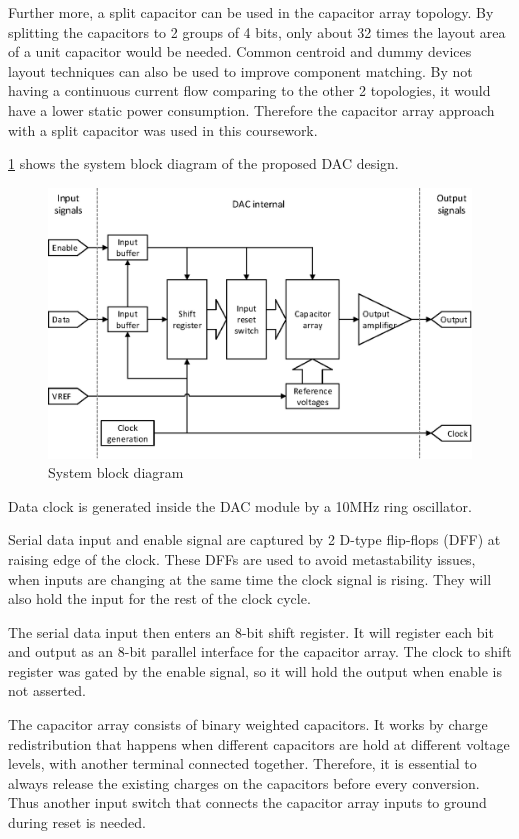 \documentclass[journal]{IEEEtran}
\newcommand{\fref}[1]{\figurename \ref{#1}}
\begin{document}
Further more, a split capacitor can be used in the capacitor array topology. By splitting the capacitors to 2 groups of 4 bits, only about 32 times the layout area of a unit capacitor would be needed. Common centroid and dummy devices layout techniques can also be used to improve component matching. By not having a continuous current flow comparing to the other 2 topologies, it would have a lower static power consumption. Therefore the capacitor array approach with a split capacitor was used in this coursework.

\fref{fig_system} shows the system block diagram of the proposed DAC design.

\begin{figure}[!t]
	\centering
	\includegraphics[width=\columnwidth]{System}
	\caption{System block diagram}
	\label{fig_system}
\end{figure}

Data clock is generated inside the DAC module by a 10MHz ring oscillator.

Serial data input and enable signal are captured by 2 D-type flip-flops (DFF) at raising edge of the clock. These DFFs are used to avoid metastability issues, when inputs are changing at the same time the clock signal is rising. They will also hold the input for the rest of the clock cycle.

The serial data input then enters an 8-bit shift register. It will register each bit and output as an 8-bit parallel interface for the capacitor array. The clock to shift register was gated by the enable signal, so it will hold the output when enable is not asserted.

The capacitor array consists of binary weighted capacitors. It works by charge redistribution that happens when different capacitors are hold at different voltage levels, with another terminal connected together. Therefore, it is essential to always release the existing charges on the capacitors before every conversion. Thus another input switch that connects the capacitor array inputs to ground during reset is needed.
\end{document}

